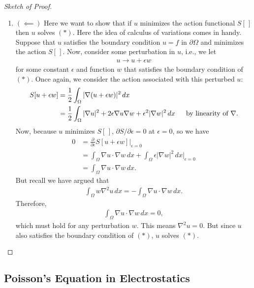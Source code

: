\documentclass{article}
\newcommand{\p}{\partial}
\newcommand{\f}[2]{\frac{#1}{#2}}
\begin{document}
\begin{proof}[Sketch of Proof]
\begin{enumerate}
		   
		\item $(\impliedby)$ Here we want to show that if $u$ minimizes the action functional $S[\,]$ then $u$ solves $(\ast)$. Here the idea of calculus of variations comes in handy. Suppose that $u$ satisfies the boundary condition $u=f$ in $\p\Omega$ and minimizes the action $S[\,]$. Now, consider some perturbation in $u$, i.e., we let
		\begin{align}
		u \to u + \epsilon w
		\end{align}
		for some constant $\epsilon$ and function $w$ that satisfies the boundary condition of $(\ast)$. Once again, we consider the action associated with this perturbed $u$:
		\begin{align}
		S[u + \epsilon w] &= \frac{1}{2}\int_\Omega \vert \nabla (u + \epsilon w)\vert^2\,dx \nonumber\\
		&= \f{1}{2}\int_\Omega \vert \nabla u \vert^2 + 2\epsilon \nabla u \nabla w + \epsilon^2\vert \nabla w \vert^2\,dx\,\hspace{0.5cm}\text{by linearity of $\nabla$}.
		\end{align} 
		Now, because $u$ minimizes $S[\,]$, ${\p S}/{\p \epsilon} = 0 $ at $\epsilon = 0$, so we have
		\begin{align}
		0 
		&= \f{\p}{\p \epsilon}S[u+\epsilon w]\bigg\vert_{\epsilon =0}\nonumber\\
		&= \int_\Omega \nabla u \cdot \nabla w \,dx + \int_\Omega \epsilon \vert \nabla w \vert^2\,dx \bigg\vert_{\epsilon=0}\nonumber\\
		&= \int_{\Omega}\nabla u \cdot \nabla w\,dx.
		\end{align}
		But recall we have argued that 
		\begin{align}\label{result}
		\int_\Omega w\nabla^2u\,dx = -\int_\Omega \nabla u  \cdot \nabla w\,dx.
		\end{align}
		Therefore,
		\begin{align}
		\int_\Omega \nabla u\cdot \nabla w\,dx = 0,
		\end{align}
		which must hold for any perturbation $w$. This means $\nabla^2u = 0$. But since $u$ also satisfies the boundary condition of $(\ast)$, $u$ solves $(\ast)$. 
	\end{enumerate}
\end{proof} 



\subsection{Poisson's Equation in Electrostatics}
\end{document}
